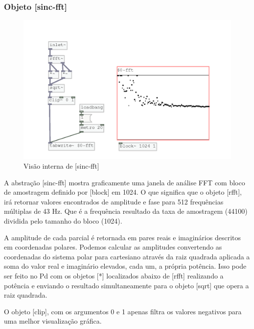 \documentclass{ppgmus}
\begin{document}

\subsubsection{Objeto [sinc-fft]}


\begin{figure}
\includegraphics[scale=.55]{sinc-fft}
\caption{Visão interna de [sinc-fft]}
\label{sinc-fft}
\end{figure}



A abstração [sinc-fft] mostra graficamente uma janela de análise FFT com bloco de amostragem
definido por [block\texttildelow] em 1024. O que significa que o objeto [rfft\texttildelow],
irá retornar valores encontrados de amplitude e fase para 512 frequências múltiplas de 43 Hz.
Que é a frequência resultado da taxa de amostragem (44100) dividida pelo tamanho do bloco (1024).

A amplitude de cada parcial é retornada em pares reais e imaginários descritos em coordenadas
polares. Podemos calcular as amplitudes convertendo as coordenadas do sistema polar para cartesiano 
através da raiz quadrada aplicada
a soma do valor real e imaginário elevados, cada um, a própria potência. Isso pode ser feito no Pd com os
objetos [*\texttildelow] localizados abaixo de [rfft\texttildelow] realizando a potência e enviando o resultado 
simultaneamente para o objeto [sqrt\texttildelow] que opera a raiz quadrada.

O objeto [clip\texttildelow], com os argumentos 0 e 1 apenas filtra os valores negativos para uma
melhor visualização gráfica.
\end{document}
